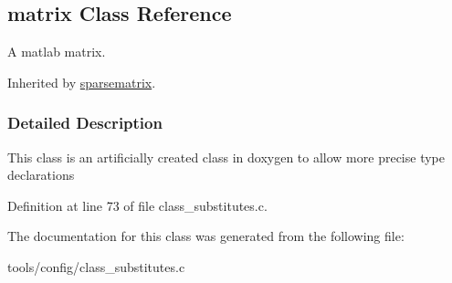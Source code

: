 \hypertarget{classmatrix}{}\subsection{matrix Class Reference}
\label{classmatrix}


A matlab matrix.  




Inherited by \hyperlink{classsparsematrix}{sparsematrix}.



\subsubsection{Detailed Description}
This class is an artificially created class in doxygen to allow more precise type declarations 

Definition at line 73 of file class\+\_\+substitutes.\+c.



The documentation for this class was generated from the following file\+:\begin{DoxyCompactItemize}
\item 
tools/config/class\+\_\+substitutes.\+c\end{DoxyCompactItemize}
